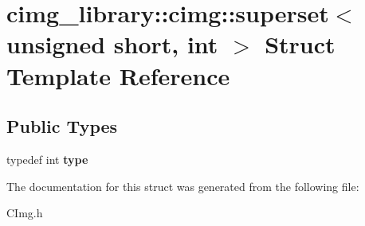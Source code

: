 \hypertarget{structcimg__library_1_1cimg_1_1superset_3_01unsigned_01short_00_01int_01_4}{\section{cimg\-\_\-library\-:\-:cimg\-:\-:superset$<$ unsigned short, int $>$ Struct Template Reference}
\label{structcimg__library_1_1cimg_1_1superset_3_01unsigned_01short_00_01int_01_4}
}
\subsection*{Public Types}
\begin{DoxyCompactItemize}
\item 
\hypertarget{structcimg__library_1_1cimg_1_1superset_3_01unsigned_01short_00_01int_01_4_ab430c92498cfa51d86fbc95ef729607b}{typedef int {\bfseries type}}\label{structcimg__library_1_1cimg_1_1superset_3_01unsigned_01short_00_01int_01_4_ab430c92498cfa51d86fbc95ef729607b}

\end{DoxyCompactItemize}


The documentation for this struct was generated from the following file\-:\begin{DoxyCompactItemize}
\item 
C\-Img.\-h\end{DoxyCompactItemize}

